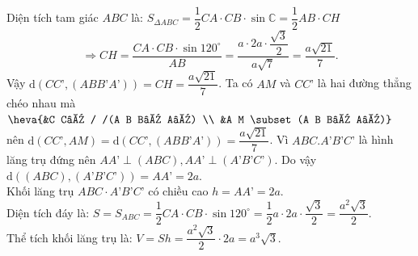 \begin{ex}
{\begin{itemchoice}
	Diện tích tam giác $A B C$ là: $S_{\Delta A B C}=\dfrac{1}{2} C A \cdot C B \cdot \sin \mathbb{C}=\dfrac{1}{2} A B \cdot C H$ $$\Rightarrow C H=\dfrac{C A \cdot C B \cdot \sin 120^{\circ}}{A B}=\dfrac{a \cdot 2 a \cdot \dfrac{\sqrt{3}}{2}}{a \sqrt{7}}=\dfrac{a \sqrt{21}}{7}.$$
	Vậy $\mathrm{d}(C C’,(A B B’ A’))=C H=\dfrac{a \sqrt{21}}{7}$.
	\itemch Ta có $A M$ và $C C’$ là hai đường thẳng chéo nhau mà $\heva{&C C’ / /(A B B’ A’) \\ &A M \subset(A B B’ A’)}$
	nên $\mathrm{d}(C C’, A M)=\mathrm{d}(C C’,(A B B’ A’))=\dfrac{a \sqrt{21}}{7}$.
	\itemch Vì $A B C.A’ B’ C’$ là hình lăng trụ đứng nên $A A’ \perp(A B C), A A’ \perp(A’ B’ C’)$. 
	\itemch Do vậy $\mathrm{d}((A B C),(A’ B’ C’))=A A’=2 a$.\\
	Khối lăng trụ $A B C \cdot A’ B’ C’$ có chiều cao $h=A A’=2 a$.\\
	 Diện tích đáy là:
	$S=S_{A B C}=\dfrac{1}{2} C A \cdot C B \cdot \sin 120^{\circ}=\dfrac{1}{2} a \cdot 2 a \cdot \dfrac{\sqrt{3}}{2}=\dfrac{a^2 \sqrt{3}}{2}.$\\
	Thể tích khối lăng trụ là: $V=S h=\dfrac{a^2 \sqrt{3}}{2} \cdot 2 a=a^3 \sqrt{3}$.
\end{itemchoice}
}
\end{ex}



